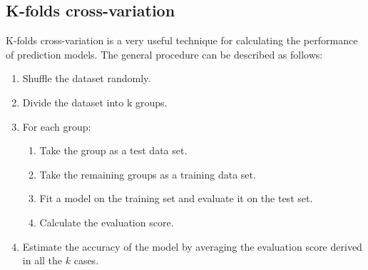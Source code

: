 \documentclass [11pt]{article}
\begin{document}
\subsection{K-folds cross-variation}
\label{sec_kcross}
K-folds cross-variation is a very useful technique for calculating the performance of prediction models. The general procedure can be described as follows:
\begin{enumerate}
\item Shuffle the dataset randomly.
\item Divide the dataset into k groups.
\item For each group:
\begin{enumerate}
\item Take the group as a test data set.
\item Take the remaining groups as a training data set.
\item Fit a model on the training set and evaluate it on the test set.
\item Calculate the evaluation score.
\end{enumerate}
\item Estimate the accuracy of the model by averaging the evaluation score derived in all the $k$ cases.
\end{enumerate}
\end{document}
